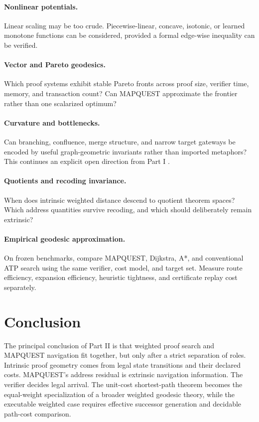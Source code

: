 \documentclass[11pt]{article}
\theoremstyle{definition}
\theoremstyle{remark}
\begin{document}
\paragraph{Nonlinear potentials.}
Linear scaling may be too crude. Piecewise-linear, concave, isotonic, or learned monotone functions can be considered, provided a formal edge-wise inequality can be verified.

\paragraph{Vector and Pareto geodesics.}
Which proof systems exhibit stable Pareto fronts across proof size, verifier time, memory, and transaction count? Can MAPQUEST approximate the frontier rather than one scalarized optimum?

\paragraph{Curvature and bottlenecks.}
Can branching, confluence, merge structure, and narrow target gateways be encoded by useful graph-geometric invariants rather than imported metaphors? This continues an explicit open direction from Part I \cite{UTGI}.

\paragraph{Quotients and recoding invariance.}
When does intrinsic weighted distance descend to quotient theorem spaces? Which address quantities survive recoding, and which should deliberately remain extrinsic?

\paragraph{Empirical geodesic approximation.}
On frozen benchmarks, compare MAPQUEST, Dijkstra, A*, and conventional ATP search using the same verifier, cost model, and target set. Measure route efficiency, expansion efficiency, heuristic tightness, and certificate replay cost separately.

\section{Conclusion}

The principal conclusion of Part II is that weighted proof search and MAPQUEST navigation fit together, but only after a strict separation of roles. Intrinsic proof geometry comes from legal state transitions and their declared costs. MAPQUEST's address residual is extrinsic navigation information. The verifier decides legal arrival. The unit-cost shortest-path theorem becomes the equal-weight specialization of a broader weighted geodesic theory, while the executable weighted case requires effective successor generation and decidable path-cost comparison.
\end{document}

